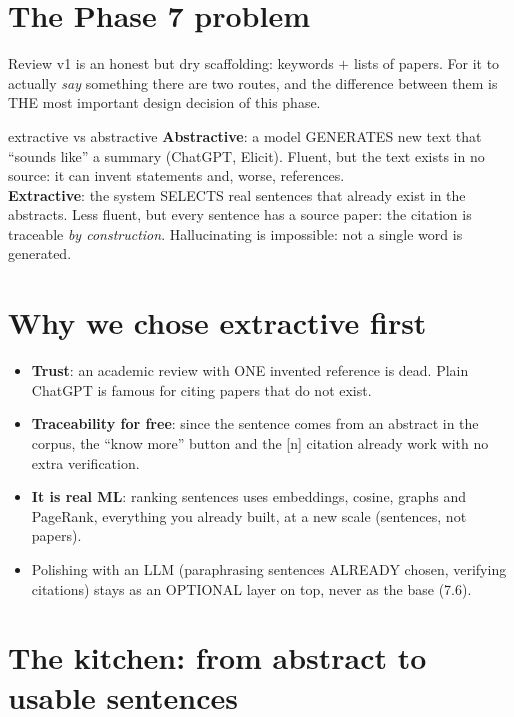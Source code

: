 \documentclass[11pt,a4paper]{article}
\begin{document}

\section{The Phase 7 problem}

Review v1 is an honest but dry scaffolding: keywords $+$ lists of papers. For it to actually
\emph{say} something there are two routes, and the difference between them is THE most
important design decision of this phase.

\begin{concepto}{extractive vs abstractive}
\textbf{Abstractive}: a model GENERATES new text that ``sounds like'' a summary (ChatGPT,
Elicit). Fluent, but the text exists in no source: it can invent statements and, worse,
references. \\
\textbf{Extractive}: the system SELECTS real sentences that already exist in the abstracts.
Less fluent, but every sentence has a source paper: the citation is traceable \emph{by
construction}. Hallucinating is impossible: not a single word is generated.
\end{concepto}

\section{Why we chose extractive first}

\begin{itemize}
  \item \textbf{Trust}: an academic review with ONE invented reference is dead. Plain ChatGPT
        is famous for citing papers that do not exist.
  \item \textbf{Traceability for free}: since the sentence comes from an abstract in the
        corpus, the ``know more'' button and the [n] citation already work with no extra
        verification.
  \item \textbf{It is real ML}: ranking sentences uses embeddings, cosine, graphs and PageRank,
        everything you already built, at a new scale (sentences, not papers).
  \item Polishing with an LLM (paraphrasing sentences ALREADY chosen, verifying citations)
        stays as an OPTIONAL layer on top, never as the base (7.6).
\end{itemize}

\section{The kitchen: from abstract to usable sentences}
\end{document}
